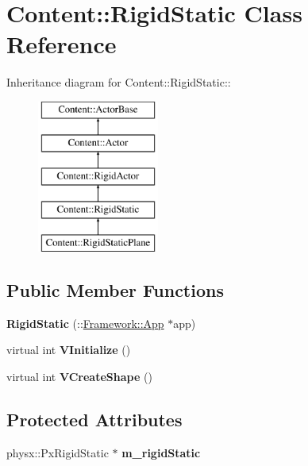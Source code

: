 \hypertarget{classContent_1_1RigidStatic}{
\section{Content::RigidStatic Class Reference}
\label{classContent_1_1RigidStatic}
}
Inheritance diagram for Content::RigidStatic::\begin{figure}[H]
\begin{center}
\leavevmode
\includegraphics[height=5cm]{classContent_1_1RigidStatic}
\end{center}
\end{figure}
\subsection*{Public Member Functions}
\begin{DoxyCompactItemize}
\item 
\hypertarget{classContent_1_1RigidStatic_aff5deca97df00649037f23dd0e934bb8}{
{\bfseries RigidStatic} (::\hyperlink{classFramework_1_1App}{Framework::App} $\ast$app)}
\label{classContent_1_1RigidStatic_aff5deca97df00649037f23dd0e934bb8}

\item 
\hypertarget{classContent_1_1RigidStatic_afc2b2e26f8f5eac394c112f6633e55d8}{
virtual int {\bfseries VInitialize} ()}
\label{classContent_1_1RigidStatic_afc2b2e26f8f5eac394c112f6633e55d8}

\item 
\hypertarget{classContent_1_1RigidStatic_a91f2c1914a39bc217ccf5954c95d52f6}{
virtual int {\bfseries VCreateShape} ()}
\label{classContent_1_1RigidStatic_a91f2c1914a39bc217ccf5954c95d52f6}

\end{DoxyCompactItemize}
\subsection*{Protected Attributes}
\begin{DoxyCompactItemize}
\item 
\hypertarget{classContent_1_1RigidStatic_a39dac9919fb9df3915cd67051d423575}{
physx::PxRigidStatic $\ast$ {\bfseries m\_\-rigidStatic}}
\label{classContent_1_1RigidStatic_a39dac9919fb9df3915cd67051d423575}

\end{DoxyCompactItemize}


